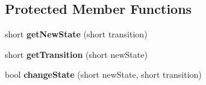 \subsection*{Protected Member Functions}
\begin{CompactItemize}
\item 
short \textbf{getNewState} (short transition)\label{classbr_1_1pucrio_1_1telemidia_1_1ginga_1_1ncl_1_1model_1_1event_1_1FormatterEvent_295514b80c6851848db3e469d32bc29e}

\item 
short \textbf{getTransition} (short newState)\label{classbr_1_1pucrio_1_1telemidia_1_1ginga_1_1ncl_1_1model_1_1event_1_1FormatterEvent_2d3b1dc4eef70fdd29b934898b20fb4f}

\item 
bool \textbf{changeState} (short newState, short transition)\label{classbr_1_1pucrio_1_1telemidia_1_1ginga_1_1ncl_1_1model_1_1event_1_1FormatterEvent_07ee42ab36f4f678dfaf9f5f9d971ac5}

\end{CompactItemize}
